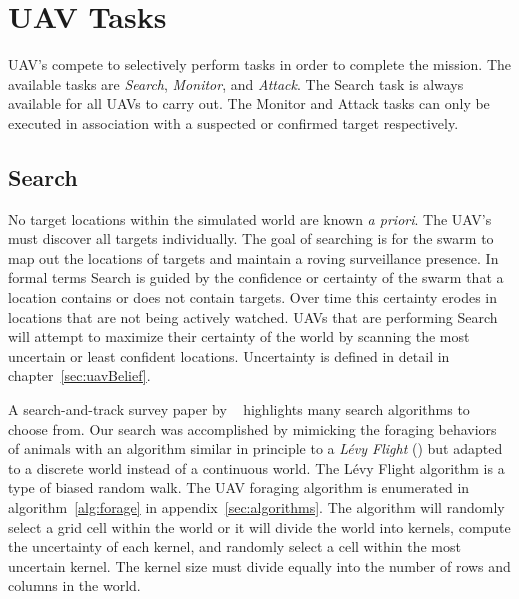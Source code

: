 \section{UAV Tasks}
UAV's compete to selectively perform tasks in order to complete the mission.  The available tasks are \textit{Search}, \textit{Monitor}, and \textit{Attack}.  The Search task is always available for all UAVs to carry out.  The Monitor and Attack tasks can only be executed in association with a suspected or confirmed target respectively.

\subsection{Search}
No target locations within the simulated world are known \textit{a priori}.  The UAV's must discover all targets individually.  The goal of searching is for the swarm to map out the locations of targets and maintain a roving surveillance presence. In formal terms Search is guided by the confidence or certainty of the swarm that a location contains or does not contain targets.  Over time this certainty erodes in locations that are not being actively watched.  UAVs that are performing Search will attempt to maximize their certainty of the world by scanning the most uncertain or least confident locations.  Uncertainty is defined in detail in chapter~\ref{sec:uavBelief}.

A search-and-track survey paper by ~\cite{senanayake} highlights many search algorithms to choose from. Our search was accomplished by mimicking the foraging behaviors of animals with an algorithm similar in principle to a \textit{L\'evy Flight} (\cite{humphries}) but adapted to a discrete world instead of a continuous world.  The L\'evy Flight algorithm is a type of biased random walk.  The UAV foraging algorithm is enumerated in algorithm~\ref{alg:forage} in appendix~\ref{sec:algorithms}.  The algorithm will randomly select a grid cell within the world or it will divide the world into kernels, compute the uncertainty of each kernel, and randomly select a cell within the most uncertain kernel.  The kernel size must divide equally into the number of rows and columns in the world.  


